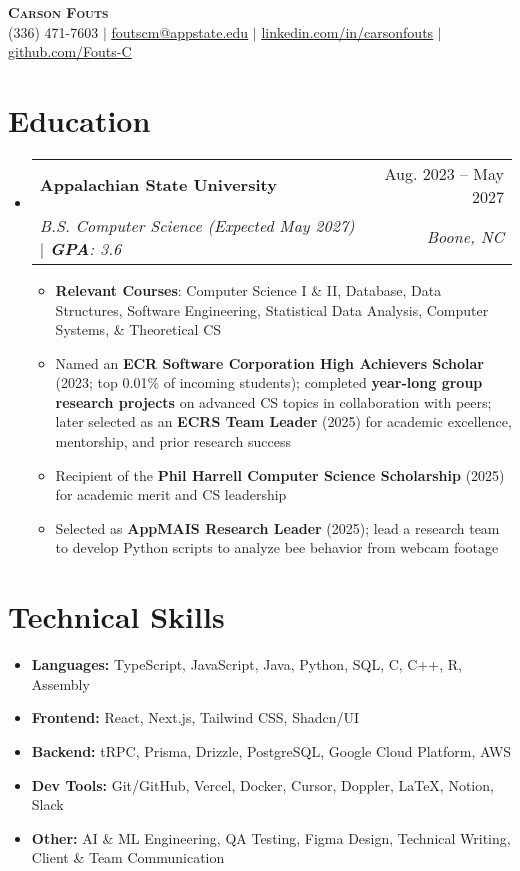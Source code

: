 \documentclass[letterpaper,11pt]{article}
\makeatletter
\newcommand{\resumeItem}[1]{
  \item\small{
    {#1 \vspace{-2pt}}
  }
}
\newcommand{\resumeSubheading}[4]{
  \vspace{-2pt}\item
    \begin{tabular*}{0.97\textwidth}[t]{l@{\extracolsep{\fill}}r}
      \textbf{#1} & #2 \\
      \textit{\small#3} & \textit{\small #4} \\
    \end{tabular*}\vspace{-7pt}
}
\newcommand{\resumeSubHeadingListStart}{\begin{itemize}[leftmargin=0.15in, label={}]}
\newcommand{\resumeSubHeadingListEnd}{\end{itemize}}
\newcommand{\resumeItemListStart}{\begin{itemize}}
\newcommand{\resumeItemListEnd}{\end{itemize}\vspace{-5pt}}
\makeatother
\begin{document}
\begin{center}
    \textbf{\Huge \scshape Carson Fouts} \\ \vspace{1pt}
    \small (336) 471-7603 $|$ \href{mailto:foutscm@appstate.edu}{\underline{foutscm@appstate.edu}} $|$ 
    \href{https://linkedin.com/in/carsonfouts}{\underline{linkedin.com/in/carsonfouts}}
    $|$ 
    \href{https://github.com/Fouts-C}{\underline{github.com/Fouts-C}}
\end{center}

\section{Education}
  \resumeSubHeadingListStart
    \resumeSubheading
      {Appalachian State University}{Aug. 2023 -- May 2027}
      {B.S. Computer Science (Expected May 2027) $|$ \textbf{GPA}: 3.6}
      {Boone, NC}
      \resumeItemListStart
        \resumeItem{\textbf{Relevant Courses}: Computer Science I \& II, Database, Data Structures, Software Engineering, Statistical Data Analysis, Computer Systems, \& Theoretical CS}
        \resumeItem{Named an \textbf{ECR Software Corporation High Achievers Scholar} (2023; top 0.01\% of incoming students); completed \textbf{year-long group research projects} on advanced CS topics in collaboration with peers; later selected as an \textbf{ECRS Team Leader} (2025) for academic excellence, mentorship, and prior research success}
        \resumeItem{Recipient of the \textbf{Phil Harrell Computer Science Scholarship} (2025) for academic merit and CS leadership}
        \resumeItem{Selected as \textbf{AppMAIS Research Leader} (2025); lead a research team to develop Python scripts to analyze bee behavior from webcam footage}
      \resumeItemListEnd
  \resumeSubHeadingListEnd

\section{Technical Skills}
\begin{itemize}[leftmargin=0.15in, label={}]
  \item[] \textbf{Languages:} TypeScript, JavaScript, Java, Python, SQL, C, C++, R, Assembly
  \item[] \textbf{Frontend:} React, Next.js, Tailwind CSS, Shadcn/UI
  \item[] \textbf{Backend:} tRPC, Prisma, Drizzle, PostgreSQL, Google Cloud Platform, AWS
  \item[] \textbf{Dev Tools:} Git/GitHub, Vercel, Docker, Cursor, Doppler, LaTeX, Notion, Slack
  \item[] \textbf{Other:} AI \& ML Engineering, QA Testing, Figma Design, Technical Writing, Client \& Team Communication
\end{itemize}
\end{document}
